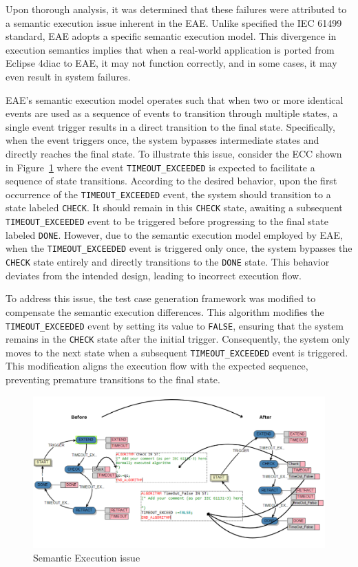 \begin{bibunit}
Upon thorough analysis, it was determined that these failures were attributed to a semantic execution issue inherent in the EAE. Unlike specified the IEC 61499 standard, EAE adopts a specific semantic execution model. This divergence in execution semantics implies that when a real-world application is ported from Eclipse 4diac to EAE, it may not function correctly, and in some cases, it may even result in system failures.

EAE's semantic execution model operates such that when two or more identical events are used as a sequence of events to transition through multiple states, a single event trigger results in a direct transition to the final state. Specifically, when the event triggers once, the system bypasses intermediate states and directly reaches the final state. 
To illustrate this issue, consider the ECC shown in Figure~\ref{fig:SemanticExexcissue} where the event \texttt{TIMEOUT\_EXCEEDED} is expected to facilitate a sequence of state transitions. According to the desired behavior, upon the first occurrence of the \texttt{TIMEOUT\_EXCEEDED} event, the system should transition to a state labeled \texttt{CHECK}. It should remain in this \texttt{CHECK} state, awaiting a subsequent \texttt{TIMEOUT\_EXCEEDED} event to be triggered before progressing to the final state labeled \texttt{DONE}. However, due to the semantic execution model employed by EAE, when the \texttt{TIMEOUT\_EXCEEDED} event is triggered only once, the system bypasses the \texttt{CHECK} state entirely and directly transitions to the \texttt{DONE} state. This behavior deviates from the intended design, leading to incorrect execution flow.

To address this issue, the test case generation framework was modified to compensate the semantic execution differences. This algorithm modifies the \texttt{TIMEOUT\_EXCEEDED} event by setting its value to \texttt{FALSE}, ensuring that the system remains in the \texttt{CHECK} state after the initial trigger. Consequently, the system only moves to the next state when a subsequent \texttt{TIMEOUT\_EXCEEDED} event is triggered. This modification aligns the execution flow with the expected sequence, preventing premature transitions to the final state.

\begin{figure}[!htbp]
	\centering
		\includegraphics[width=0.99\linewidth,clip]{MX_Papers/Paper10/Figures/SemanticExexcissue.png}
		\caption{Semantic Execution issue}
		\label{fig:SemanticExexcissue}	
 \end{figure}


\end{bibunit}
